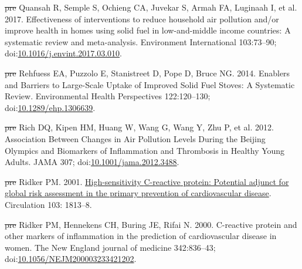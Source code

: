 \documentclass[
  letterpaper,
  DIV=11,
  numbers=noendperiod]{scrartcl}
\newlength{\cslhangindent}
\newenvironment{CSLReferences}[2] %
 {\begin{list}{}{%
  \setlength{\itemindent}{0pt} %
  \setlength{\leftmargin}{0pt} %
  \setlength{\parsep}{0pt} %
  \ifodd #1
   \setlength{\leftmargin}{\cslhangindent} %
   \setlength{\itemindent}{-1\cslhangindent} %
  \fi
  \setlength{\itemsep}{#2\baselineskip}}} %
 {\end{list}} %
\providecommand{\DIFdeltex}[1]{{\protect\color{red}\sout{#1}}}                      %
\providecommand{\DIFaddbegin}{} %
\providecommand{\DIFaddend}{} %
\providecommand{\DIFdelbegin}{} %
\providecommand{\DIFdelend}{} %
\providecommand{\DIFdel}[1]{\texorpdfstring{\DIFdeltex{#1}}{}} %
\newcommand{\DIFscaledelfig}{0.5}
\newlength{\DIFdelgraphicswidth} %
\newlength{\DIFdelgraphicsheight} %
\newcommand{\DIFaddincludegraphics}[2][]{{\color{blue}\fbox{\DIFOincludegraphics[#1]{#2}}}} %
\newcommand{\DIFdelincludegraphics}[2][]{%
\sbox{\DIFdelgraphicsbox}{\DIFOincludegraphics[#1]{#2}}%
\settoboxwidth{\DIFdelgraphicswidth}{\DIFdelgraphicsbox} %
\settoboxtotalheight{\DIFdelgraphicsheight}{\DIFdelgraphicsbox} %
\scalebox{\DIFscaledelfig}{%
\parbox[b]{\DIFdelgraphicswidth}{\usebox{\DIFdelgraphicsbox}\\[-\baselineskip] \rule{\DIFdelgraphicswidth}{0em}}\llap{\resizebox{\DIFdelgraphicswidth}{\DIFdelgraphicsheight}{%
\setlength{\unitlength}{\DIFdelgraphicswidth}%
\begin{picture}(1,1)%
\thicklines\linethickness{2pt} %
{\color[rgb]{1,0,0}\put(0,0){\framebox(1,1){}}}%
{\color[rgb]{1,0,0}\put(0,0){\line( 1,1){1}}}%
{\color[rgb]{1,0,0}\put(0,1){\line(1,-1){1}}}%
\end{picture}%
}\hspace*{3pt}}} %
} %
\DeclareRobustCommand{\DIFaddbegin}{\DIFOaddbegin \let\includegraphics\DIFaddincludegraphics} %
\DeclareRobustCommand{\DIFaddend}{\DIFOaddend \let\includegraphics\DIFOincludegraphics} %
\DeclareRobustCommand{\DIFdelbegin}{\DIFOdelbegin \let\includegraphics\DIFdelincludegraphics} %
\DeclareRobustCommand{\DIFdelend}{\DIFOaddend \let\includegraphics\DIFOincludegraphics} %
\begin{document}
\begin{CSLReferences}{1}{1}
\DIFdelbegin %
\DIFdel{pre}%
\DIFdelend \DIFaddbegin {}
\DIFaddend Quansah R, Semple S, Ochieng CA, Juvekar S, Armah FA, Luginaah I, et al.
2017. Effectiveness of interventions to reduce household air pollution
and/or improve health in homes using solid fuel in low-and-middle income
countries: {A} systematic review and meta-analysis. Environment
International 103:73--90;
doi:\href{https://doi.org/10.1016/j.envint.2017.03.010}{10.1016/j.envint.2017.03.010}.

\DIFdelbegin %
\DIFdel{pre}%
\DIFdelend \DIFaddbegin {}
\DIFaddend Rehfuess EA, Puzzolo E, Stanistreet D, Pope D, Bruce NG. 2014. Enablers
and {Barriers} to {Large-Scale Uptake} of {Improved Solid Fuel Stoves}:
{A Systematic Review}. Environmental Health Perspectives 122:120--130;
doi:\href{https://doi.org/10.1289/ehp.1306639}{10.1289/ehp.1306639}.

\DIFdelbegin %
\DIFdel{pre}%
\DIFdelend \DIFaddbegin {}
\DIFaddend Rich DQ, Kipen HM, Huang W, Wang G, Wang Y, Zhu P, et al. 2012.
Association {Between Changes} in {Air Pollution Levels During} the
{Beijing Olympics} and {Biomarkers} of {Inflammation} and {Thrombosis}
in {Healthy Young Adults}. JAMA 307;
doi:\href{https://doi.org/10.1001/jama.2012.3488}{10.1001/jama.2012.3488}.

\DIFdelbegin %
\DIFdel{pre}%
\DIFdelend \DIFaddbegin {}
\DIFaddend Ridker PM. 2001.
\href{https://www.ncbi.nlm.nih.gov/pubmed/11282915}{High-sensitivity
{C-reactive} protein: Potential adjunct for global risk assessment in
the primary prevention of cardiovascular disease}. Circulation 103:
1813--8.

\DIFdelbegin %
\DIFdel{pre}%
\DIFdelend \DIFaddbegin {}
\DIFaddend Ridker PM, Hennekens CH, Buring JE, Rifai N. 2000. C-reactive protein
and other markers of inflammation in the prediction of cardiovascular
disease in women. The New England journal of medicine 342:836--43;
doi:\href{https://doi.org/10.1056/NEJM200003233421202}{10.1056/NEJM200003233421202}.


\end{CSLReferences}
\end{document}

